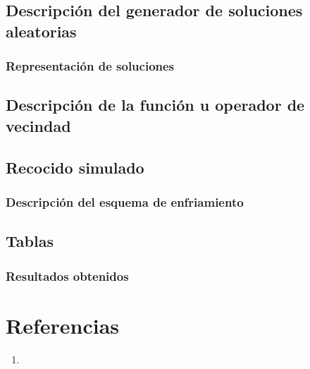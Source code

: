 \documentclass{article}
\begin{document}
\subsection*{Descripción del generador de soluciones aleatorias}

\subsubsection*{Representación de soluciones}

\subsection*{Descripción de la función u operador de vecindad}

\subsection*{Recocido simulado}

\subsubsection*{Descripción del esquema de enfriamiento}

\subsection*{Tablas}

\subsubsection*{Resultados obtenidos}

\newpage
\section*{Referencias}
\begin{enumerate}
	\item 
\end{enumerate}
\end{document}
